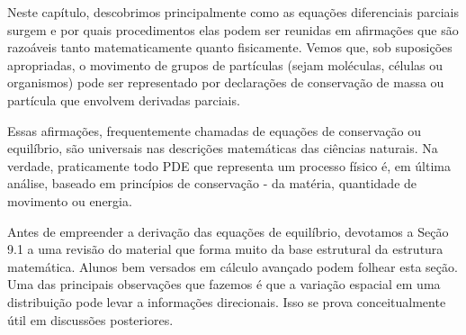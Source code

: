 {{Neste capítulo, descobrimos principalmente como as equações diferenciais parciais surgem e por quais procedimentos elas podem ser reunidas em afirmações que são razoáveis tanto matematicamente quanto fisicamente. Vemos que, sob suposições apropriadas, o movimento de grupos de partículas (sejam moléculas, células ou organismos) pode ser representado por declarações de conservação de massa ou partícula que envolvem derivadas parciais.}}

{{Essas afirmações, frequentemente chamadas de equações de conservação ou equilíbrio, são universais nas descrições matemáticas das ciências naturais. Na verdade, praticamente todo PDE que representa um processo físico é, em última análise, baseado em princípios de conservação - da matéria, quantidade de movimento ou energia.}}

{{Antes de empreender a derivação das equações de equilíbrio, devotamos a Seção 9.1 a uma revisão do material que forma muito da base estrutural da estrutura matemática. Alunos bem versados em cálculo avançado podem folhear esta seção. Uma das principais observações que fazemos é que a variação espacial em uma distribuição pode levar a informações direcionais. Isso se prova conceitualmente útil em discussões posteriores.}}

